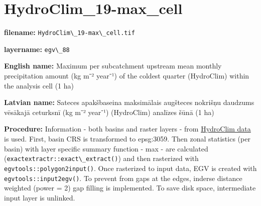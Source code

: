 \documentclass[
]{book}
\newcommand{\passthrough}[1]{#1}
\begin{document}
\section{HydroClim\_19-max\_cell}\label{ch06.088}

\textbf{filename:} \passthrough{\lstinline!HydroClim\_19-max\_cell.tif!}

\textbf{layername:} \passthrough{\lstinline!egv\_88!}

\textbf{English name:} Maximum per subcatchment upstream mean monthly precipitation amount (kg m⁻² year⁻¹) of the coldest quarter (HydroClim) within the analysis cell (1 ha)

\textbf{Latvian name:} Sateces apakšbaseina maksimālais augšteces nokrišņu daudzums vēsākajā ceturksnī (kg m⁻² year⁻¹) (HydroClim) analīzes šūnā (1 ha)

\textbf{Procedure:} Information - both basins and raster layers - from \hyperref[Ch04.12]{HydroClim data}
is used. First, basin CRS is transformed to epsg:3059. Then zonal statistics (per basin) with
layer specific summary function - max - are calculated (\passthrough{\lstinline!exactextractr::exact\_extract()!})
and then rasterized with \passthrough{\lstinline!egvtools::polygon2input()!}. Once rasterized to input data,
EGV is created with \passthrough{\lstinline!egvtools::input2egv()!}. To prevent from gaps at the edges,
inderse distance weighted (power = 2) gap filling is implemented. To save disk space,
intermediate input layer is unlinked.
\end{document}
